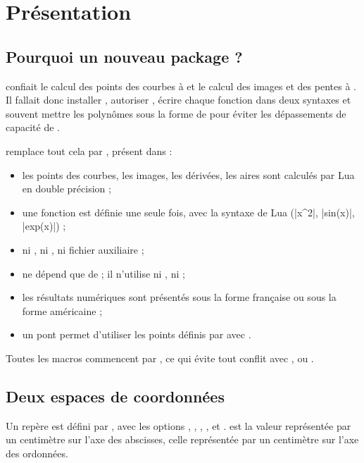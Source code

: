 \section{Présentation}

\subsection{Pourquoi un nouveau package ?}

 confiait le calcul des points des courbes à  et le calcul des images et des pentes à . Il fallait donc installer , autoriser , écrire chaque fonction dans deux syntaxes et souvent mettre les polynômes sous la forme de  pour éviter les dépassements de capacité de .

 remplace tout cela par , présent dans  :
\begin{itemize}
  \item les points des courbes, les images, les dérivées, les aires sont calculés par Lua en double précision ;
  \item une fonction est définie une seule fois, avec la syntaxe de Lua (|x^2|, |sin(x)|, |exp(x)|) ;
  \item ni , ni , ni fichier auxiliaire ;
  \item {} ne dépend que de \TIKZ ; il n'utilise ni , ni  ;
  \item les résultats numériques sont présentés sous la forme française ou sous la forme américaine ;
  \item un pont permet d'utiliser les points définis par  avec .
\end{itemize}

Toutes les macros commencent par , ce qui évite tout conflit avec ,  ou .

\subsection{Deux espaces de coordonnées}

Un repère est défini par , avec les options , , , ,  et .  est la valeur représentée par un centimètre sur l'axe des abscisses,  celle représentée par un centimètre sur l'axe des ordonnées.

